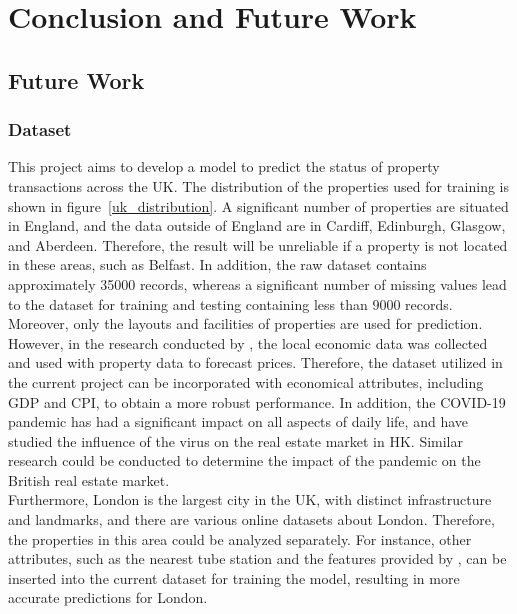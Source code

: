 \documentclass[12pt,twoside]{report}
\begin{document}
\chapter{Conclusion and Future Work}
\section{Future Work}
\subsection{Dataset}
This project aims to develop a model to predict the status of property transactions across the UK. The distribution of the properties used for training is shown in \mbox{figure \ref{uk_distribution}}. A significant number of properties are situated in England, and the data outside of England are in Cardiff, Edinburgh, Glasgow, and Aberdeen. Therefore, the result will be unreliable if a property is not located in these areas, such as Belfast. In addition, the raw dataset contains approximately 35000 records, whereas a significant number of missing values lead to the dataset for training and testing containing less than 9000 records.
\\

Moreover, only the layouts and facilities of properties are used for prediction. However, in the research conducted by \citet{RN20}, the local economic data was collected and used with property data to forecast prices. Therefore, the dataset utilized in the current project can be incorporated with economical attributes, including GDP and CPI, to obtain a more robust performance. In addition, the COVID-19 pandemic has had a significant impact on all aspects of daily life, and \citet{RN24} have studied the influence of the virus on the real estate market in HK. Similar research could be conducted to determine the impact of the pandemic on the British real estate market. 
\\

Furthermore, London is the largest city in the UK, with distinct infrastructure and landmarks, and there are various online datasets about London. Therefore, the properties in this area could be analyzed separately. For instance, other attributes, such as the nearest tube station and the features provided by \citet{RN26}, can be inserted into the current dataset for training the model, resulting in more accurate predictions for London. 
\end{document}
